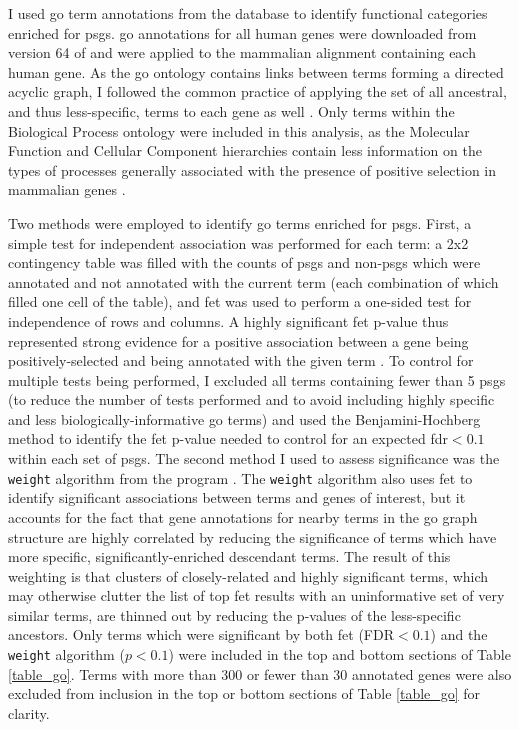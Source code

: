 I used \ac{go} term annotations from the \ens database to identify
functional categories enriched for \acp{psg}. \ac{go} annotations for
all human genes were downloaded from version 64 of \ens and were
applied to the mammalian alignment containing each human gene. As the
\ac{go} ontology contains links between terms forming a directed
acyclic graph, I followed the common practice of applying the set of
all ancestral, and thus less-specific, terms to each gene as well
\citep{Rivals2007}. Only terms within the Biological Process ontology
were included in this analysis, as the Molecular Function and Cellular
Component hierarchies contain less information on the types of
processes generally associated with the presence of positive selection
in mammalian genes \citep{Macaque2007}.

Two methods were employed to identify \ac{go} terms enriched for
\acp{psg}. First, a simple test for independent association was
performed for each term: a 2x2 contingency table was filled with the
counts of \acp{psg} and non-\acp{psg} which were annotated and not
annotated with the current term (each combination of which filled one
cell of the table), and \ac{fet} was used to perform a one-sided test
for independence of rows and columns. A highly significant \ac{fet}
p-value thus represented strong evidence for a positive association
between a gene being positively-selected and being annotated with the
given term \citep{Rivals2007}. To control for multiple tests being
performed, I excluded all terms containing fewer than 5 \acp{psg} (to
reduce the number of tests performed and to avoid including highly
specific and less biologically-informative \ac{go} terms) and used the
Benjamini-Hochberg method to identify the \ac{fet} p-value needed to
control for an expected \ac{fdr}$<0.1$ within each set of
\acp{psg}. The second method I used to assess significance was the
\texttt{weight} algorithm from the \topgo program
\citep{Alexa2006a}. The \texttt{weight} algorithm also uses \ac{fet}
to identify significant associations between terms and genes of
interest, but it accounts for the fact that gene annotations for
nearby terms in the \ac{go} graph structure are highly correlated by
reducing the significance of terms which have more specific,
significantly-enriched descendant terms. The result of this weighting
is that clusters of closely-related and highly significant terms,
which may otherwise clutter the list of top \ac{fet} results with an
uninformative set of very similar terms, are thinned out by reducing
the p-values of the less-specific ancestors. Only terms which were
significant by both \ac{fet} (FDR$<0.1$) and the \texttt{weight}
algorithm ($p<0.1$) were included in the top and bottom sections of
Table \ref{table_go}. Terms with more than 300 or fewer than 30
annotated genes were also excluded from inclusion in the top or bottom
sections of Table \ref{table_go} for clarity.

